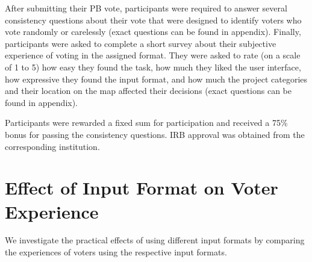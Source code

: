 \documentclass[runningheads]{llncs}
\newcommand{\kibitz}[2]{\ifnum\Comments=1{\color{#1}{#2}}\fi}
\newcommand{\rf}[1]{\kibitz{blue}{[Roy says:#1]}}
\newcommand{\kg}[1]{\kibitz{red}{[Kobi says:#1]}}
\newcommand{\gb}[1]{\kibitz{brown}{[GB:#1]}}
\begin{document}
 
 After   submitting their PB vote, participants were required to answer several consistency questions about their vote that were  designed to identify voters who vote randomly or carelessly (exact questions can be found in appendix).  Finally, participants were asked to complete a short survey about their subjective experience of voting in the assigned format. They were asked to rate (on a scale of 1 to 5) how easy they found the task, how much they liked the user interface, %
  how   expressive  they found the input format, 
 and how much the project categories and their location on the map    affected their decisions (exact questions can be found in appendix). 
 
 Participants were rewarded a  fixed sum    for participation and  received a 75\% bonus for passing the  consistency questions.
 IRB approval was obtained from the corresponding institution.

 

\section{Effect of Input Format on Voter Experience}


We investigate the practical effects of using different input formats by comparing  the experiences of voters using the respective input formats.
\end{document}
